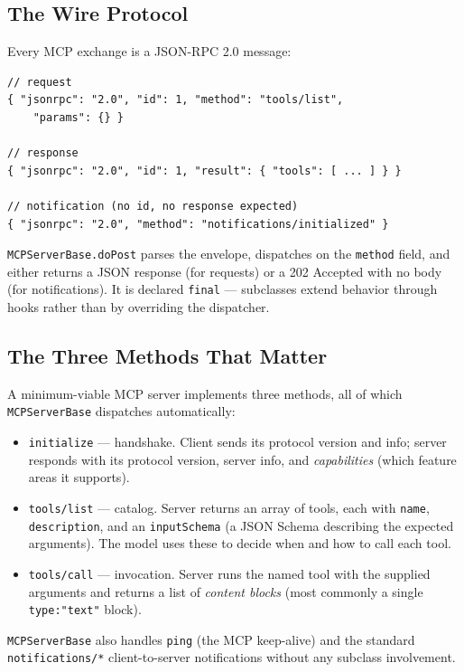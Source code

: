 \subsection{The Wire Protocol}

Every MCP exchange is a JSON-RPC 2.0 message:

\begin{lstlisting}[style=java]
// request
{ "jsonrpc": "2.0", "id": 1, "method": "tools/list",
    "params": {} }

// response
{ "jsonrpc": "2.0", "id": 1, "result": { "tools": [ ... ] } }

// notification (no id, no response expected)
{ "jsonrpc": "2.0", "method": "notifications/initialized" }
\end{lstlisting}

\noindent
\texttt{MCPServerBase.doPost} parses the envelope, dispatches on the \texttt{method} field, and either returns a JSON response (for requests) or a 202 Accepted with no body (for notifications).  It is declared \texttt{final} --- subclasses extend behavior through hooks rather than by overriding the dispatcher.

\subsection{The Three Methods That Matter}

A minimum-viable MCP server implements three methods, all of which \texttt{MCPServerBase} dispatches automatically:

\begin{itemize}
  \item \texttt{initialize} --- handshake.  Client sends its protocol version and info; server responds with its protocol version, server info, and \emph{capabilities} (which feature areas it supports).
  \item \texttt{tools/list} --- catalog.  Server returns an array of tools, each with \texttt{name}, \texttt{description}, and an \texttt{inputSchema} (a JSON Schema describing the expected arguments).  The model uses these to decide when and how to call each tool.
  \item \texttt{tools/call} --- invocation.  Server runs the named tool with the supplied arguments and returns a list of \emph{content blocks} (most commonly a single \texttt{type:"text"} block).
\end{itemize}

\noindent
\texttt{MCPServerBase} also handles \texttt{ping} (the MCP keep-alive) and the standard \texttt{notifications/*} client-to-server notifications without any subclass involvement.

